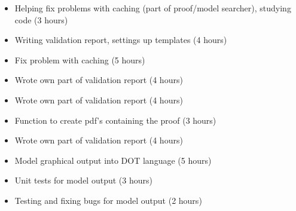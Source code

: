 %
{ \begin{itemize} 
  \item Helping fix problems with caching (part of proof/model searcher), studying code (3 hours)
 \item  Writing validation report, settings up templates (4 hours)
 \end{itemize} 
}%
{ \begin{itemize} 
 \item Fix problem with caching (5 hours)
 \item Wrote own part of validation report (4 hours)
 \end{itemize} 
}%
{ \begin{itemize} 
 \item Wrote own part of validation report (4 hours)
 \item Function to create pdf's containing the proof (3 hours)
 \end{itemize} 
}%
{ \begin{itemize} 
  \item Wrote own part of validation report (4 hours)
 \item Model graphical output into DOT language (5 hours)
 \item Unit tests for model output (3 hours)
 \item Testing and fixing bugs for model output (2 hours)
 \end{itemize} 
}%
